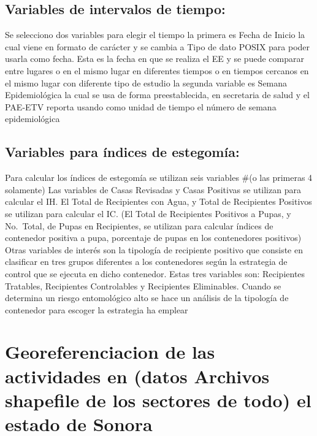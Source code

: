 \documentclass[
  letterpaper,
  twocolumn,
  landscape]{report}
\begin{document}
\subsection*{Variables de intervalos de
tiempo:}\label{variables-de-intervalos-de-tiempo}

Se selecciono dos variables para elegir el tiempo la primera es Fecha de
Inicio la cual viene en formato de carácter y se cambia a Tipo de dato
POSIX para poder usarla como fecha. Esta es la fecha en que se realiza
el EE y se puede comparar entre lugares o en el mismo lugar en
diferentes tiempos o en tiempos cercanos en el mismo lugar con diferente
tipo de estudio la segunda variable es Semana Epidemiológica la cual se
usa de forma preestablecida, en secretaria de salud y el PAE-ETV reporta
usando como unidad de tiempo el número de semana epidemiológica

\subsection*{Variables para índices de
estegomía:}\label{variables-para-uxedndices-de-estegomuxeda}

Para calcular los índices de estegomía se utilizan seis variables \#(o
las primeras 4 solamente) Las variables de Casas Revisadas y Casas
Positivas se utilizan para calcular el IH. El Total de Recipientes con
Agua, y Total de Recipientes Positivos se utilizan para calcular el IC.
(El Total de Recipientes Positivos a Pupas, y No.~Total, de Pupas en
Recipientes, se utilizan para calcular índices de contenedor positiva a
pupa, porcentaje de pupas en los contenedores positivos) Otras variables
de interés son la tipología de recipiente positivo que consiste en
clasificar en tres grupos diferentes a los contenedores según la
estrategia de control que se ejecuta en dicho contenedor. Estas tres
variables son: Recipientes Tratables, Recipientes Controlables y
Recipientes Eliminables. Cuando se determina un riesgo entomológico alto
se hace un análisis de la tipología de contenedor para escoger la
estrategia ha emplear

\section{Georeferenciacion de las actividades en (datos Archivos
shapefile de los sectores de todo) el estado de
Sonora}\label{georeferenciacion-de-las-actividades-en-datos-archivos-shapefile-de-los-sectores-de-todo-el-estado-de-sonora}
\end{document}
